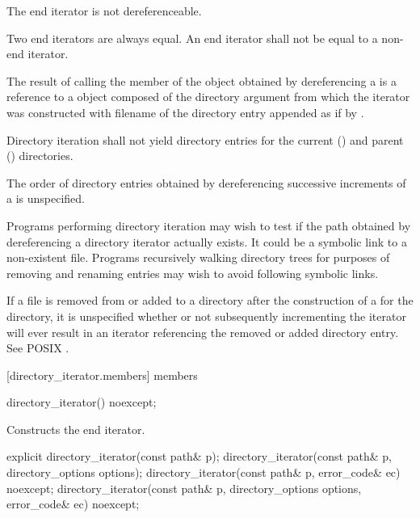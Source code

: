 \pnum
The end iterator is not dereferenceable.

\pnum
Two end iterators are always equal. An end iterator shall not be equal to a non-end
iterator.

\pnum
The result of calling the  member of the  object obtained by dereferencing a  is a reference to a  object composed of the directory argument from which the iterator was
constructed with filename of the directory entry appended as if by .

\pnum
Directory iteration shall not yield directory entries for the current ()
and parent () directories.

\pnum
The order of directory entries obtained by dereferencing successive
increments of a  is unspecified.

\pnum
\begin{note}
Programs performing directory iteration may wish to test if the
path obtained by dereferencing a directory iterator actually exists. It could be
a symbolic link to a non-existent file. Programs recursively
walking directory trees for purposes of removing and renaming entries may wish
to avoid following symbolic links.

\pnum
If a file  is removed from or added to a directory after the
construction of a  for the directory, it is
unspecified whether or not subsequently incrementing the iterator will ever
result in an iterator referencing the removed or added directory entry. See
POSIX .
\end{note}

[directory_iterator.members]{ members}

%
\begin{itemdecl}
directory_iterator() noexcept;
\end{itemdecl}

\begin{itemdescr}
\pnum
\effects Constructs the end iterator.
\end{itemdescr}

%
\begin{itemdecl}
explicit directory_iterator(const path& p);
directory_iterator(const path& p, directory_options options);
directory_iterator(const path& p, error_code& ec) noexcept;
directory_iterator(const path& p, directory_options options, error_code& ec) noexcept;
\end{itemdecl}

